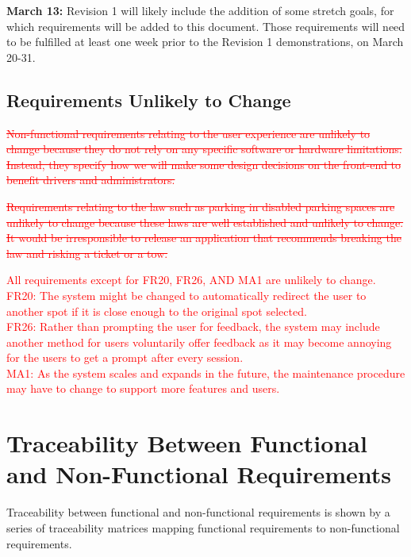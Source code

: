 \documentclass[12pt,letterpaper]{article}
\begin{document}
\textbf{March 13:} Revision 1 will likely include the addition of some stretch
goals, for which requirements will be added to this document. Those requirements
will need to be fulfilled at least one week prior to the Revision 1
demonstrations, on March 20-31.

\subsection{Requirements Unlikely to Change}
\textcolor{red}{\st{Non-functional requirements relating to the user experience
are unlikely to change because they do not rely on any specific software or
hardware limitations. Instead, they specify how we will make some design
decisions on the front-end to benefit drivers and administrators. }}

\textcolor{red}{\st{Requirements relating to the law such as parking in disabled
parking spaces are unlikely to change because these laws are well established
and unlikely to change. It would be irresponsible to release an application that
recommends breaking the law and risking a ticket or a tow.}}

\textcolor{red}{All requirements except for FR20, FR26, AND MA1 are unlikely to
change.\\
FR20: The system might be changed to automatically redirect the user to another
spot if it is close enough to the original spot selected.\\
FR26: Rather than prompting the user for feedback, the system may include
another method for users voluntarily offer feedback as it may become annoying
for the users to get a prompt after every session.\\
MA1: As the system scales and expands in the future, the maintenance procedure
may have to change to support more features and users.}


\newpage
\section{Traceability Between Functional and Non-Functional Requirements}
Traceability between functional and non-functional requirements is shown by a
series of traceability matrices mapping functional requirements to
non-functional requirements.
\label{traceabilityMatrixSection}
\end{document}

